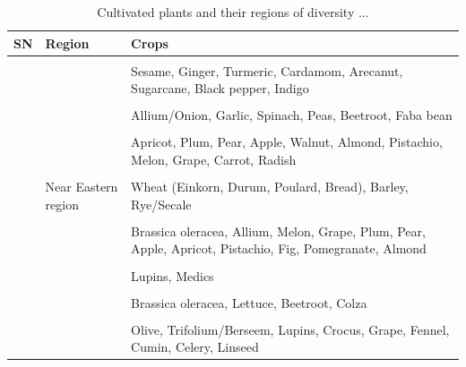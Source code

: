 \documentclass[11pt,ignorenonframetext,aspectratio=169]{beamer}
\begin{document}
\begin{frame}{}
\protect\hypertarget{section-7}{}
\begin{table}

\caption{\label{tab:cultivated-megacentres-tab2}Cultivated plants and their regions of diversity ...}
\centering
\fontsize{6}{8}\selectfont
\begin{tabular}[t]{>{\raggedright\arraybackslash}p{4em}>{\raggedright\arraybackslash}p{14em}>{\raggedright\arraybackslash}p{28em}}
\toprule
SN & Region & Crops\\
\midrule
\cellcolor{gray!6}{} & \cellcolor{gray!6}{} & \cellcolor{gray!6}{Citrus, Banana, Mango, Sunhemp, Tree cotton}\\
 &  & Sesame, Ginger, Turmeric, Cardamom, Arecanut, Sugarcane, Black pepper, Indigo\\
\cellcolor{gray!6}{5} & \cellcolor{gray!6}{Central Asian region} & \cellcolor{gray!6}{Wheat (Bread/Club/Shot), Rye}\\
 &  & Allium/Onion, Garlic, Spinach, Peas, Beetroot, Faba bean\\
\cellcolor{gray!6}{} & \cellcolor{gray!6}{} & \cellcolor{gray!6}{Lentil, Chickpea}\\
\addlinespace
 &  & Apricot, Plum, Pear, Apple, Walnut, Almond, Pistachio, Melon, Grape, Carrot, Radish\\
\cellcolor{gray!6}{} & \cellcolor{gray!6}{} & \cellcolor{gray!6}{Hemp/Cannabis, Sesame, Flax, Safflower}\\
6 & Near Eastern region & Wheat (Einkorn, Durum, Poulard, Bread), Barley, Rye/Secale\\
\cellcolor{gray!6}{} & \cellcolor{gray!6}{} & \cellcolor{gray!6}{Faba bean, Chickpea, French bean, Lentil, Pea}\\
 &  & Brassica oleracea, Allium, Melon, Grape, Plum, Pear, Apple, Apricot, Pistachio, Fig, Pomegranate, Almond\\
\addlinespace
\cellcolor{gray!6}{} & \cellcolor{gray!6}{} & \cellcolor{gray!6}{Safflower, Sesame, Flax}\\
 &  & Lupins, Medics\\
\cellcolor{gray!6}{7} & \cellcolor{gray!6}{Mediterranean region} & \cellcolor{gray!6}{Wheat (Durum, Turgidum), Oats}\\
 &  & Brassica oleracea, Lettuce, Beetroot, Colza\\
\cellcolor{gray!6}{} & \cellcolor{gray!6}{} & \cellcolor{gray!6}{Faba bean, Radish}\\
\addlinespace
 &  & Olive, Trifolium/Berseem, Lupins, Crocus, Grape, Fennel, Cumin, Celery, Linseed\\
\bottomrule
\end{tabular}
\end{table}
\end{frame}
\end{document}
